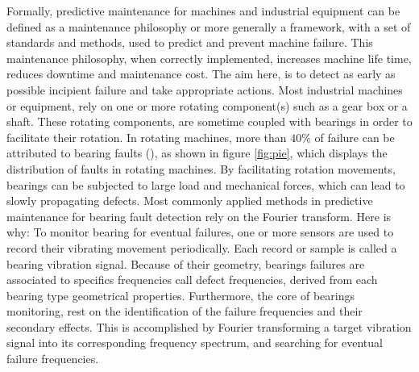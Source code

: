 \documentclass[../Main/thesis.tex]{subfiles}
\begin{document}
Formally, predictive maintenance  for machines and industrial equipment can be defined as a maintenance philosophy or more generally a framework, with a set of standards and methods, used to predict and prevent machine failure. This maintenance philosophy, when correctly implemented, increases machine life time, reduces downtime and maintenance cost. The aim here, is to detect as early as possible incipient failure and take appropriate actions.
\justify
Most industrial machines or equipment, rely on one or more rotating component(s) such as a gear box or a shaft. These rotating components,
are sometime coupled with bearings in order to facilitate their rotation.
In rotating machines, more than $40 \% $ of failure can be attributed to bearing faults (\cite{albrecht1986}), as shown in figure \ref{fig:pie}, which displays the distribution of faults in rotating machines. By facilitating rotation movements, bearings can be subjected to large load and mechanical forces, which can lead to slowly propagating defects. 
\justify
Most commonly applied methods in predictive maintenance for bearing fault detection rely on the Fourier transform.
Here is why: To monitor bearing for eventual failures, one or more sensors are used to record their vibrating movement periodically. Each record or sample is called a bearing vibration signal. Because of their geometry, bearings failures are associated to specifics frequencies call defect frequencies, derived from each bearing type geometrical properties. Furthermore, the core of bearings monitoring, rest on the identification of the failure frequencies and their secondary effects. This is accomplished by Fourier transforming a target vibration signal into its corresponding frequency spectrum, and searching for eventual failure frequencies. 
\end{document}

